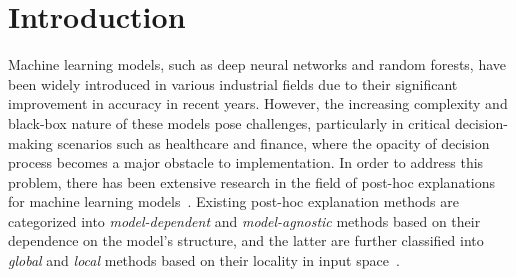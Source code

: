 \documentclass[11pt]{article}
\begin{document}
\section{Introduction}
Machine learning models, such as deep neural networks and random forests,
have been widely introduced in various industrial fields
due to their significant improvement in accuracy in recent years.
However,
the increasing complexity and black-box nature of these models pose challenges,
particularly in critical decision-making scenarios such as healthcare and finance,
where the opacity of decision process becomes a major obstacle to implementation.
In order to address this problem,
there has been extensive research in the field of post-hoc explanations
for machine learning models~\cite{%
  guidotti2018local,radulovic2023bella,ribeiro2016why,ribeiro2018anchors}.
Existing post-hoc explanation methods are categorized
into \emph{model-dependent} and \emph{model-agnostic} methods
based on their dependence on the model's structure,
and the latter are further classified into \emph{global} and \emph{local} methods
based on their locality in input space~\cite{samek2021explaining}.
\end{document}
